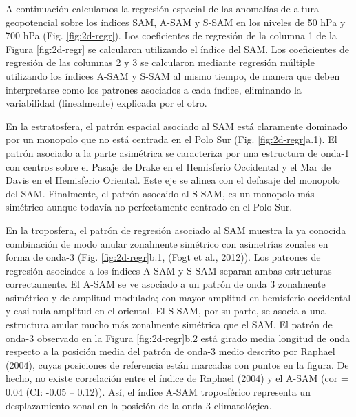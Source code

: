 \documentclass[12pt,oneside]{reedthesis}
\begin{document}
A continuación calculamos la regresión espacial de las anomalías de altura geopotencial sobre los índices SAM, A-SAM y S-SAM en los niveles de 50 hPa y 700 hPa (Fig. \ref{fig:2d-regr}).
Los coeficientes de regresión de la columna 1 de la Figura \ref{fig:2d-regr} se calcularon utilizando el índice del SAM.
Los coeficientes de regresión de las columnas 2 y 3 se calcularon mediante regresión múltiple utilizando los índices A-SAM y S-SAM al mismo tiempo, de manera que deben interpretarse como los patrones asociados a cada índice, eliminando la variabilidad (linealmente) explicada por el otro.

En la estratosfera, el patrón espacial asociado al SAM está claramente dominado por un monopolo que no está centrada en el Polo Sur (Fig. \ref{fig:2d-regr}a.1).
El patrón asociado a la parte asimétrica se caracteriza por una estructura de onda-1 con centros sobre el Pasaje de Drake en el Hemisferio Occidental y el Mar de Davis en el Hemisferio Oriental.
Este eje se alinea con el defasaje del monopolo del SAM.
Finalmente, el patrón asocaido al S-SAM, es un monopolo más simétrico aunque todavía no perfectamente centrado en el Polo Sur.

En la troposfera, el patrón de regresión asociado al SAM muestra la ya conocida combinación de modo anular zonalmente simétrico con asimetrías zonales en forma de onda-3 (Fig. \ref{fig:2d-regr}b.1, (Fogt et al., 2012)).
Los patrones de regresión asociados a los índices A-SAM y S-SAM separan ambas estructuras correctamente.
El A-SAM se ve asociado a un patrón de onda 3 zonalmente asimétrico y de amplitud modulada; con mayor amplitud en hemisferio occidental y casi nula amplitud en el oriental.
El S-SAM, por su parte, se asocia a una estructura anular mucho más zonalmente simétrica que el SAM.
El patrón de onda-3 observado en la Figura \ref{fig:2d-regr}b.2 está girado media longitud de onda respecto a la posición media del patrón de onda-3 medio descrito por Raphael (2004), cuyas posiciones de referencia están marcadas con puntos en la figura.
De hecho, no existe correlación entre el índice de Raphael (2004) y el A-SAM (cor = 0.04 (CI: -0.05 -- 0.12)).
Así, el índice A-SAM troposférico representa un desplazamiento zonal en la posición de la onda 3 climatológica.
\end{document}
